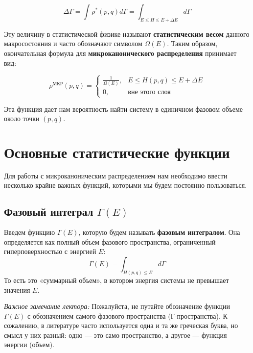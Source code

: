 \documentclass[../general/general]{subfiles}
\begin{document}
\begin{equation}
    \Delta \Gamma = \int \rho^*(p, q) d\Gamma = \int_{E \le H \le E + \Delta E} d\Gamma
\end{equation}

Эту величину в статистической физике называют \textbf{статистическим весом} данного макросостояния и часто обозначают символом $\Omega(E)$. Таким образом, окончательная формула для \textbf{микроканонического распределения} принимает вид:

\begin{equation}
    \rho^{\text{МКР}}(p, q) = 
    \begin{cases} 
      \frac{1}{\Omega(E)}, & E \le H(p, q) \le E + \Delta E \\
      0, & \text{вне этого слоя}
    \end{cases}
\end{equation}

Эта функция дает нам вероятность найти систему в единичном фазовом объеме около точки $(p, q)$. 

\section{Основные статистические функции}

Для работы с микроканоническим распределением нам необходимо ввести несколько крайне важных функций, которыми мы будем постоянно пользоваться.

\subsection{Фазовый интеграл $\Gamma(E)$}

Введем функцию $\Gamma(E)$, которую будем называть \textbf{фазовым интегралом}. Она определяется как полный объем фазового пространства, ограниченный гиперповерхностью с энергией $E$:
\begin{equation}
    \Gamma(E) = \int_{H(p, q) \le E} d\Gamma
\end{equation}
То есть это «суммарный объем», в котором энергия системы не превышает значения $E$.

\textit{Важное замечание лектора:} Пожалуйста, не путайте обозначение функции $\Gamma(E)$ с обозначением самого фазового пространства (Г-пространства). К сожалению, в литературе часто используется одна и та же греческая буква, но смысл у них разный: одно — это само пространство, а другое — функция энергии (объем).
\end{document}
